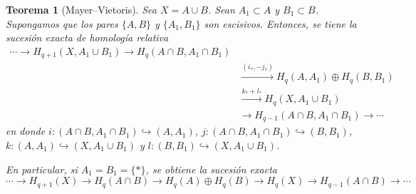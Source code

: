 \documentclass[11pt,a4paper]{article}
\theoremstyle{plain}
\newtheorem{theorem}{Teorema}[section]
\theoremstyle{definition}
\theoremstyle{remark}
\begin{document}
\begin{theorem}[Mayer--Vietoris]
\label{thm:mayer-vietoris}
Sea $X=A\cup B$. Sean $A_1\subset A$ y $B_1\subset B$. Supongamos que los
pares $\{A,B\}$ y $\{A_1,B_1\}$ son escisivos. Entonces, se tiene la
sucesión exacta de homología relativa
\[
\begin{aligned}
\cdots\to H_{q+1}(X,A_1\cup B_1)\to H_q(A\cap B,A_1\cap B_1)&\\
&\xrightarrow{(i_*,-j_*)}H_q(A,A_1)\oplus H_q(B,B_1)\\
&\xrightarrow{k_*+l_*}H_q(X,A_1\cup B_1)\\
&\to H_{q-1}(A\cap B,A_1\cap B_1)\to\cdots
\end{aligned}
\]
en donde $i:(A\cap B,A_1\cap B_1)\hookrightarrow(A,A_1)$,
$j:(A\cap B,A_1\cap B_1)\hookrightarrow(B,B_1)$,
$k:(A,A_1)\hookrightarrow(X,A_1\cup B_1)$ y
$l:(B,B_1)\hookrightarrow(X,A_1\cup B_1)$.

En particular, si $A_1=B_1=\{*\}$, se obtiene la sucesión exacta
\[
\cdots\to H_{q+1}(X)\to H_q(A\cap B)\to H_q(A)\oplus H_q(B)\to H_q(X)\to H_{q-1}(A\cap B)\to\cdots
\]
\end{theorem}
\end{document}
